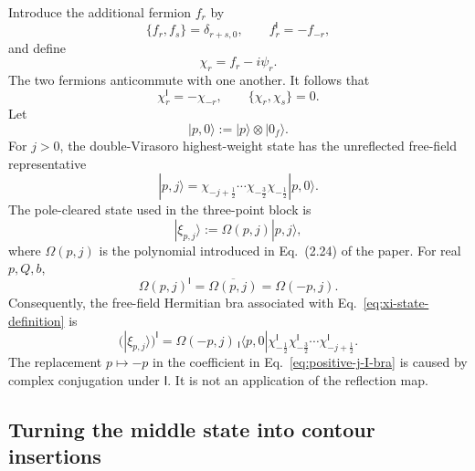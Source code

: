 \documentclass[11pt]{article}
\newcommand{\Ibra}[1]{{}_{\mathsf I}\!\langle #1|}
\begin{document}
Introduce the additional fermion \(f_r\) by
\begin{equation}
 \{f_r,f_s\}=\delta_{r+s,0},
 \qquad
 f_r^{\mathsf I}=-f_{-r},
 \label{eq:auxiliary-fermion-I-rule}
\end{equation}
and define
\begin{equation}
 \chi_r=f_r-i\psi_r.
 \label{eq:chi-mode-definition}
\end{equation}
The two fermions anticommute with one another.  It follows that
\begin{equation}
 \chi_r^{\mathsf I}=-\chi_{-r},
 \qquad
 \{\chi_r,\chi_s\}=0.
 \label{eq:chi-I-and-anticommutator}
\end{equation}
Let
\begin{equation}
 |p,0\rangle:=|p\rangle\otimes|0_f\rangle.
 \label{eq:extended-Fock-vacuum}
\end{equation}
For \(j>0\), the double-Virasoro highest-weight state has the unreflected
free-field representative
\begin{equation}
 |p,j\rangle
 =
 \chi_{-j+\frac12}\cdots
 \chi_{-\frac32}\chi_{-\frac12}|p,0\rangle.
 \label{eq:positive-j-unreflected-state}
\end{equation}
The pole-cleared state used in the three-point block is
\begin{equation}
 |\xi_{p,j}\rangle
 :=
 \Omega(p,j)|p,j\rangle,
 \label{eq:xi-state-definition}
\end{equation}
where \(\Omega(p,j)\) is the polynomial introduced in Eq.~(2.24) of the
paper.  For real \(p,Q,b\),
\begin{equation}
 \Omega(p,j)^{\mathsf I}
 =
 \overline{\Omega(p,j)}
 =
 \Omega(-p,j).
 \label{eq:Omega-I-conjugation}
\end{equation}
Consequently, the free-field Hermitian bra associated with
Eq.~\eqref{eq:xi-state-definition} is
\begin{equation}
 \bigl(|\xi_{p,j}\rangle\bigr)^{\mathsf I}
 =
 \Omega(-p,j)\,
 \Ibra{p,0}
 \chi_{-\frac12}^{\mathsf I}
 \chi_{-\frac32}^{\mathsf I}\cdots
 \chi_{-j+\frac12}^{\mathsf I}.
 \label{eq:positive-j-I-bra}
\end{equation}
The replacement \(p\mapsto-p\) in the coefficient in
Eq.~\eqref{eq:positive-j-I-bra} is caused by complex conjugation under
\(\mathsf I\).  It is not an application of the reflection map.

\subsection{Turning the middle state into contour insertions}
\end{document}
